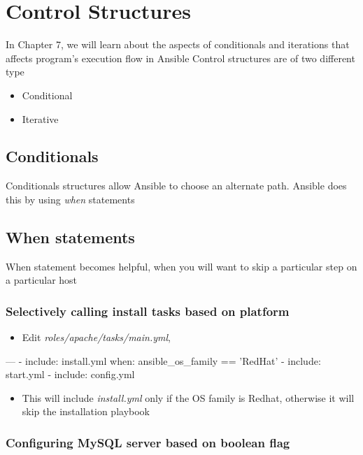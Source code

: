 \chapter{Control Structures}

In Chapter 7, we will learn about the aspects of conditionals and iterations that affects program's execution flow in Ansible\newline
Control structures are of two different type

\begin{itemize}
\item Conditional
\item Iterative
\end{itemize}

\section{Conditionals}

Conditionals structures allow Ansible to choose an alternate path. Ansible does this by using \emph{when} statements

\section{\textbf{When} statements}

When statement becomes helpful, when you will want to skip a particular step on a particular host

\subsection{Selectively calling install tasks based on platform}

\begin{itemize}
\item Edit \emph{roles/apache/tasks/main.yml},
\end{itemize}

\begin{code}
---
- include: install.yml
  when: ansible_os_family == 'RedHat'
- include: start.yml
- include: config.yml
\end{code}

\begin{itemize}
\item This will include \emph{install.yml} only if the OS family is Redhat, otherwise it will skip the installation playbook
\end{itemize}

\subsection{Configuring MySQL server based on boolean flag}

